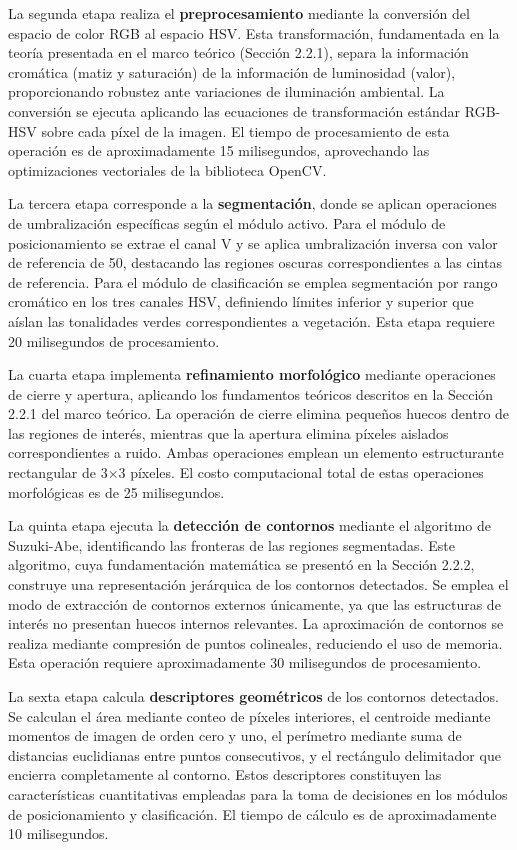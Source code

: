 La segunda etapa realiza el \textbf{preprocesamiento} mediante la conversión del espacio de color RGB al espacio HSV. Esta transformación, fundamentada en la teoría presentada en el marco teórico (Sección 2.2.1), separa la información cromática (matiz y saturación) de la información de luminosidad (valor), proporcionando robustez ante variaciones de iluminación ambiental. La conversión se ejecuta aplicando las ecuaciones de transformación estándar RGB-HSV sobre cada píxel de la imagen. El tiempo de procesamiento de esta operación es de aproximadamente 15 milisegundos, aprovechando las optimizaciones vectoriales de la biblioteca OpenCV.

La tercera etapa corresponde a la \textbf{segmentación}, donde se aplican operaciones de umbralización específicas según el módulo activo. Para el módulo de posicionamiento se extrae el canal V y se aplica umbralización inversa con valor de referencia de 50, destacando las regiones oscuras correspondientes a las cintas de referencia. Para el módulo de clasificación se emplea segmentación por rango cromático en los tres canales HSV, definiendo límites inferior y superior que aíslan las tonalidades verdes correspondientes a vegetación. Esta etapa requiere 20 milisegundos de procesamiento.

La cuarta etapa implementa \textbf{refinamiento morfológico} mediante operaciones de cierre y apertura, aplicando los fundamentos teóricos descritos en la Sección 2.2.1 del marco teórico. La operación de cierre elimina pequeños huecos dentro de las regiones de interés, mientras que la apertura elimina píxeles aislados correspondientes a ruido. Ambas operaciones emplean un elemento estructurante rectangular de 3×3 píxeles. El costo computacional total de estas operaciones morfológicas es de 25 milisegundos.

La quinta etapa ejecuta la \textbf{detección de contornos} mediante el algoritmo de Suzuki-Abe, identificando las fronteras de las regiones segmentadas. Este algoritmo, cuya fundamentación matemática se presentó en la Sección 2.2.2, construye una representación jerárquica de los contornos detectados. Se emplea el modo de extracción de contornos externos únicamente, ya que las estructuras de interés no presentan huecos internos relevantes. La aproximación de contornos se realiza mediante compresión de puntos colineales, reduciendo el uso de memoria. Esta operación requiere aproximadamente 30 milisegundos de procesamiento.

La sexta etapa calcula \textbf{descriptores geométricos} de los contornos detectados. Se calculan el área mediante conteo de píxeles interiores, el centroide mediante momentos de imagen de orden cero y uno, el perímetro mediante suma de distancias euclidianas entre puntos consecutivos, y el rectángulo delimitador que encierra completamente al contorno. Estos descriptores constituyen las características cuantitativas empleadas para la toma de decisiones en los módulos de posicionamiento y clasificación. El tiempo de cálculo es de aproximadamente 10 milisegundos.

